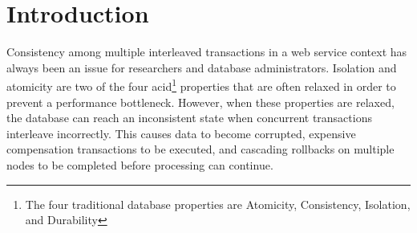 \chapter{Introduction}\label{chap:intro}

Consistency among multiple interleaved transactions in a web service context has always been an issue for researchers and database administrators. Isolation and atomicity are two of the four \gls{acid}\footnote{The four traditional database properties are Atomicity, Consistency, Isolation, and Durability} properties that are often relaxed in order to prevent a performance bottleneck. However, when these properties are relaxed, the database can reach an inconsistent state when concurrent transactions interleave incorrectly. This causes data to become corrupted, expensive compensation transactions to be executed, and cascading rollbacks on multiple nodes to be completed before processing can continue. 




